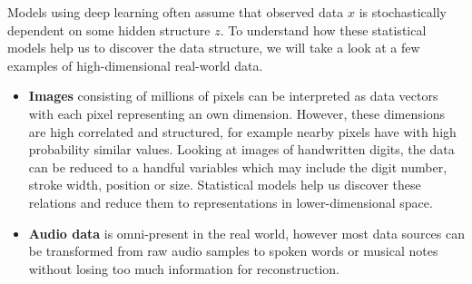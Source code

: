 

Models using deep learning often assume that observed data $x$ is stochastically dependent on some hidden structure $z$.
To understand how these statistical models help us to discover the data structure, we will take a look at a few examples of high-dimensional real-world data.

\begin{itemize}
  \item \textbf{Images} consisting of millions of pixels can be interpreted as data vectors with each pixel representing an own dimension.
  However, these dimensions are high correlated and structured, for example nearby pixels have with high probability similar values.
  Looking at images of handwritten digits, the data can be reduced to a handful variables which may include the digit number, stroke width, position or size.
  Statistical models help us discover these relations and reduce them to representations in lower-dimensional space.
  \item \textbf{Audio data} is omni-present in the real world, however most data sources can be transformed from raw audio samples to spoken words or musical notes without losing too much information for reconstruction.
\end{itemize}

